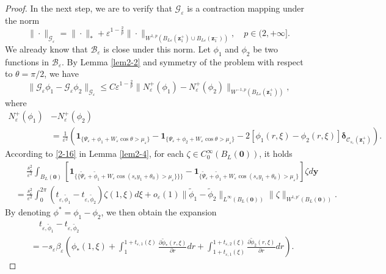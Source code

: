 \documentclass[12pt,reqno]{amsart}
\numberwithin{equation}{section}
\theoremstyle{definition}
\theoremstyle{remark}
\newcommand{\ep}{\varepsilon}
\begin{document}
\begin{proof}
		In the next step, we are to verify that $\mathcal G_\varepsilon$ is a contraction mapping under the norm
		\begin{equation*}
			\|\cdot\|_{\mathcal G_\varepsilon}=\|\cdot\|_*+\varepsilon^{1-\frac{2}{p}}\|\cdot\|_{W^{1,p}(B_{L\varepsilon}(\boldsymbol z_1^+)\cup B_{L\varepsilon}(\boldsymbol z_1^-))}, \quad p\in(2,+\infty].
		\end{equation*}
		We already know that $\mathcal B_\varepsilon$ is close under this norm. Let $\phi_1$ and $\phi_2$ be two functions in $\mathcal B_\varepsilon$. By Lemma \ref{lem2-2} and symmetry of the problem with respect to $\theta=\pi/2$, we have
		\begin{equation*}
			\|\mathcal G_\varepsilon\phi_1-\mathcal G_\varepsilon\phi_2\|_{\mathcal G_\varepsilon}\le C\varepsilon^{1-\frac{2}{p}}\|N_\varepsilon^+(\phi_1)-N_\varepsilon^+(\phi_2) \|_{W^{-1,p}(B_{L\varepsilon}(\boldsymbol z_1^+))},
		\end{equation*}
		where
		\begin{align*}
				N_\varepsilon^+(\phi_1)&-N_\varepsilon^+(\phi_2)\\
				&=\frac{1}{\varepsilon^2}\left(\boldsymbol 1_{\{\Psi_\varepsilon+\phi_1+W_\ep\cos\theta>\mu_\varepsilon\}}-\boldsymbol1_{\{\Psi_\varepsilon+\phi_2+W_\ep\cos\theta>\mu_\ep\}}-2\left[\phi_1(r,\xi)-\phi_2(r,\xi)\right]\boldsymbol\delta_{\mathcal C_{s_\varepsilon}(\boldsymbol z_1^+)}\right).
		\end{align*}
		According to \eqref{2-16} in Lemma \ref{lem2-4}, for each $\zeta\in C_0^\infty(B_L(\boldsymbol 0))$, it holds
		\begin{align*}
				&\quad\,\, \frac{s_\varepsilon^2}{\varepsilon^2}\int_{B_L(\boldsymbol 0)}\left[\boldsymbol1_{\{\{\tilde\Psi_\varepsilon+\tilde\phi_1+W_\ep\cos(s_\varepsilon y_1+\theta_0)>\mu_\varepsilon\}\}\}}-\boldsymbol1_{\{\tilde\Psi_\varepsilon+\tilde\phi_1+W_\ep\cos(s_\varepsilon y_1+\theta_0)>\mu_\varepsilon\}}\right]\zeta d\boldsymbol y\\
				&=\frac{s_\varepsilon^2}{\varepsilon^2}\int_0^{2\pi}(t_{\varepsilon,\tilde\phi_1}-t_{\varepsilon,\tilde\phi_2})\zeta(1,\xi)d\xi+o_\varepsilon(1)\|\tilde\phi_1-\tilde\phi_2\|_{L^\infty(B_L(\boldsymbol 0))}\|\zeta\|_{W^{1,p'}(B_L(\boldsymbol 0))}.
		\end{align*}
		By denoting $\phi^*=\phi_1-\phi_2$, we then obtain the expansion
		\begin{align*}
				&\quad t_{\varepsilon,\tilde\phi_1}-t_{\varepsilon,\tilde\phi_2}\\
				&=-s_\varepsilon\beta_\varepsilon\left(\phi_*(1,\xi)+\int_1^{1+t_{\varepsilon,1}(\xi)}\frac{\partial\tilde\phi_*(r,\xi)}{\partial r}dr+\int_{1+t_{\varepsilon,1}(\xi)}^{1+t_{\varepsilon,2}(\xi)}\frac{\partial\tilde\phi_2(r,\xi)}{\partial r}dr\right).

\end{align*}
\end{proof}
\end{document}
